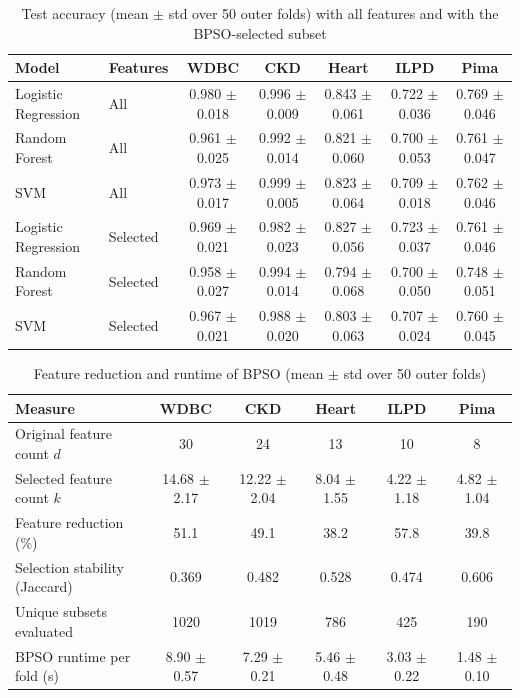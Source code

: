 \documentclass[conference]{IEEEtran}
\begin{document}
\begin{table}[!t]
\centering
\caption{Test accuracy (mean $\pm$ std over 50 outer folds) with all features
and with the BPSO-selected subset}
\label{tab:accuracy}
\footnotesize
\setlength{\tabcolsep}{4pt}
\begin{tabular}{llccccc}
\toprule
\textbf{Model} & \textbf{Features} & \textbf{WDBC} & \textbf{CKD} & \textbf{Heart} & \textbf{ILPD} & \textbf{Pima} \\
\midrule
Logistic Regression & All      & 0.980 $\pm$ 0.018 & 0.996 $\pm$ 0.009 & 0.843 $\pm$ 0.061 & 0.722 $\pm$ 0.036 & 0.769 $\pm$ 0.046 \\
Random Forest       & All      & 0.961 $\pm$ 0.025 & 0.992 $\pm$ 0.014 & 0.821 $\pm$ 0.060 & 0.700 $\pm$ 0.053 & 0.761 $\pm$ 0.047 \\
SVM                 & All      & 0.973 $\pm$ 0.017 & 0.999 $\pm$ 0.005 & 0.823 $\pm$ 0.064 & 0.709 $\pm$ 0.018 & 0.762 $\pm$ 0.046 \\
\midrule
Logistic Regression & Selected & 0.969 $\pm$ 0.021 & 0.982 $\pm$ 0.023 & 0.827 $\pm$ 0.056 & 0.723 $\pm$ 0.037 & 0.761 $\pm$ 0.046 \\
Random Forest       & Selected & 0.958 $\pm$ 0.027 & 0.994 $\pm$ 0.014 & 0.794 $\pm$ 0.068 & 0.700 $\pm$ 0.050 & 0.748 $\pm$ 0.051 \\
SVM                 & Selected & 0.967 $\pm$ 0.021 & 0.988 $\pm$ 0.020 & 0.803 $\pm$ 0.063 & 0.707 $\pm$ 0.024 & 0.760 $\pm$ 0.045 \\
\bottomrule
\end{tabular}
\end{table}

\begin{table}[!t]
\centering
\caption{Feature reduction and runtime of BPSO (mean $\pm$ std over 50 outer folds)}
\label{tab:reduction}
\footnotesize
\setlength{\tabcolsep}{5pt}
\begin{tabular}{lccccc}
\toprule
\textbf{Measure} & \textbf{WDBC} & \textbf{CKD} & \textbf{Heart} & \textbf{ILPD} & \textbf{Pima} \\
\midrule
Original feature count $d$ & 30 & 24 & 13 & 10 & 8 \\
Selected feature count $k$ & 14.68 $\pm$ 2.17 & 12.22 $\pm$ 2.04 & 8.04 $\pm$ 1.55 & 4.22 $\pm$ 1.18 & 4.82 $\pm$ 1.04 \\
Feature reduction (\%) & 51.1 & 49.1 & 38.2 & 57.8 & 39.8 \\
Selection stability (Jaccard) & 0.369 & 0.482 & 0.528 & 0.474 & 0.606 \\
Unique subsets evaluated & 1020 & 1019 & 786 & 425 & 190 \\
BPSO runtime per fold (s) & 8.90 $\pm$ 0.57 & 7.29 $\pm$ 0.21 & 5.46 $\pm$ 0.48 & 3.03 $\pm$ 0.22 & 1.48 $\pm$ 0.10 \\
\bottomrule
\end{tabular}
\end{table}
\end{document}
